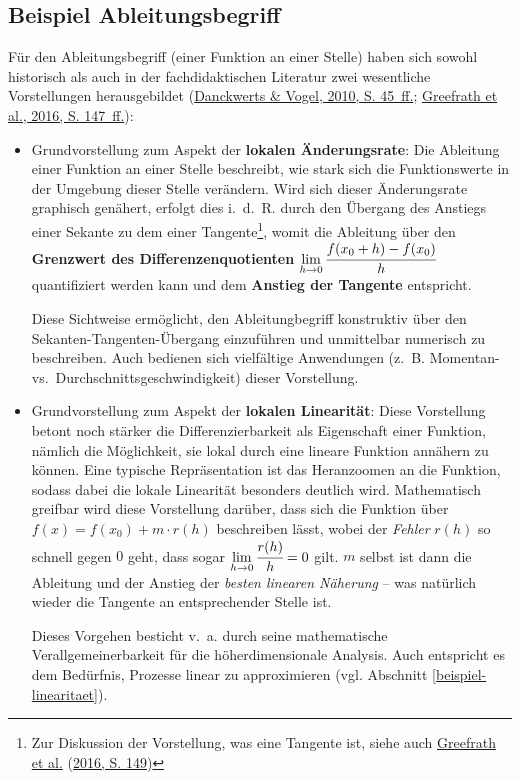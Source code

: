 \documentclass[
  ngerman,
]{scrbook}
\theoremstyle{definition}
\theoremstyle{definition}
\theoremstyle{definition}
\theoremstyle{definition}
\theoremstyle{remark}
\begin{document}
\hypertarget{beispiel-ableitungsbegriff}{%
\subsection{Beispiel Ableitungsbegriff}\label{beispiel-ableitungsbegriff}}

Für den Ableitungsbegriff (einer Funktion an einer Stelle) haben sich sowohl historisch als auch in der fachdidaktischen Literatur zwei wesentliche Vorstellungen herausgebildet (\protect\hyperlink{ref-Danckwerts2010}{Danckwerts \& Vogel, 2010, S. 45~ff.}; \protect\hyperlink{ref-Greefrath2016}{Greefrath et al., 2016, S. 147~ff.}):

\begin{itemize}
\item
  Grundvorstellung zum Aspekt der \textbf{lokalen Änderungsrate}: Die Ableitung einer Funktion an einer Stelle beschreibt, wie stark sich die Funktionswerte in der Umgebung dieser Stelle verändern. Wird sich dieser Änderungsrate graphisch genähert, erfolgt dies i.~d.~R. durch den Übergang des Anstiegs einer Sekante zu dem einer Tangente\footnote{Zur Diskussion der Vorstellung, was eine Tangente ist, siehe auch \protect\hyperlink{ref-Greefrath2016}{Greefrath et al.} (\protect\hyperlink{ref-Greefrath2016}{2016, S. 149})}, womit die Ableitung über den \textbf{Grenzwert des Differenzenquotienten} \(\lim\limits_{h\rightarrow 0}\cfrac{f(x_0+h)-f(x_0)}{h}\) quantifiziert werden kann und dem \textbf{Anstieg der Tangente} entspricht.

  Diese Sichtweise ermöglicht, den Ableitungbegriff konstruktiv über den Sekanten-Tangenten-Übergang einzuführen und unmittelbar numerisch zu beschreiben. Auch bedienen sich vielfältige Anwendungen (z.~B. Momentan- vs.~Durchschnittsgeschwindigkeit) dieser Vorstellung.
\item
  Grundvorstellung zum Aspekt der \textbf{lokalen Linearität}: Diese Vorstellung betont noch stärker die Differenzierbarkeit als Eigenschaft einer Funktion, nämlich die Möglichkeit, sie lokal durch eine lineare Funktion annähern zu können. Eine typische Repräsentation ist das Heranzoomen an die Funktion, sodass dabei die lokale Linearität besonders deutlich wird. Mathematisch greifbar wird diese Vorstellung darüber, dass sich die Funktion über \(f(x) = f(x_0) + m\cdot r(h)\) beschreiben lässt, wobei der \emph{Fehler} \(r(h)\) so schnell gegen \(0\) geht, dass sogar \(\lim\limits_{h\rightarrow 0}\cfrac{r(h)}{h}=0\) gilt. \(m\) selbst ist dann die Ableitung und der Anstieg der \emph{besten linearen Näherung} -- was natürlich wieder die Tangente an entsprechender Stelle ist.

  Dieses Vorgehen besticht v.~a. durch seine mathematische Verallgemeinerbarkeit für die höherdimensionale Analysis. Auch entspricht es dem Bedürfnis, Prozesse linear zu approximieren (vgl. Abschnitt \ref{beispiel-linearitaet}).
\end{itemize}
\end{document}
